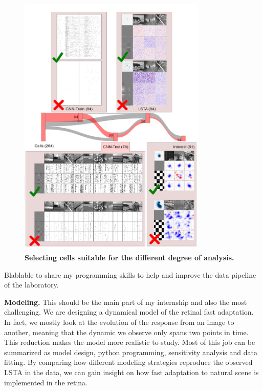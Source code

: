 \begin{figure}
    \centering
    \includegraphics[width=0.8\textwidth]{pics/CellSelection.png}
    \caption{\textbf{Selecting cells suitable for the different degree of analysis.}}
    \label{fig:cell_selecion}
\end{figure}


Blablable to share my programming skills to help and improve the data pipeline
of
the
laboratory.

\textbf{Modeling.} This should be the main part of my internship and also the
most challenging. We are designing a dynamical model of the retinal fast
adaptation. In fact, we mostly look at the evolution of the response from an
image to another, meaning that the dynamic we observe only spans two points in
time. This reduction makes the model more realistic to study. Most of this job
can be summarized as model design, python programming, sensitivity analysis and
data fitting. By comparing how different modeling strategies reproduce the
observed LSTA in the data, we can gain insight on how fast adaptation to
natural scene is implemented in the retina.

